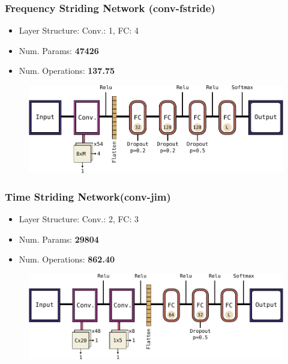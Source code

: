 \begin{frame}
  \frametitle{Frequency Striding Network (conv-fstride)}
  \vspace{-0.5cm}
  \begin{itemize}
    \item Layer Structure: Conv.: 1, FC: 4
    \item Num. Params: \textbf{\num{47426}} 
    \item Num. Operations: \textbf{\SI{137.75}{\kilo\ops}}
  \end{itemize}
  \begin{figure} \includegraphics[height=0.35\textheight]{../4_nn/figs/nn_arch_cnn_fstride.pdf} \end{figure}
\end{frame}

\begin{frame}
  \frametitle{Time Striding Network(conv-jim)}
  \vspace{-0.5cm}
  \begin{itemize}
    \item Layer Structure: Conv.: 2, FC: 3
    \item Num. Params: \textbf{\num{29804}}
    \item Num. Operations: \textbf{\SI{862.40}{\kilo\ops}}
  \end{itemize}
  \begin{figure} \includegraphics[height=0.35\textheight]{../4_nn/figs/nn_arch_cnn_jim.pdf} \end{figure}
\end{frame}


